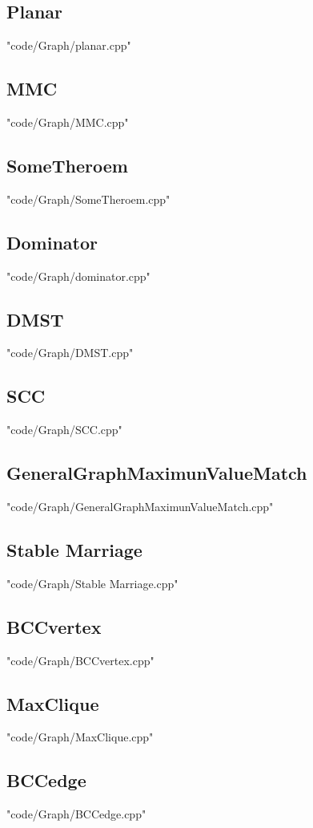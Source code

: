 \documentclass [8pt,a4paper,twocolumn]{article}
\begin{document}
\subsection{Planar}
 {"code/Graph/planar.cpp"}
\subsection{MMC}
 {"code/Graph/MMC.cpp"}
\subsection{SomeTheroem}
 {"code/Graph/SomeTheroem.cpp"}
\subsection{Dominator}
 {"code/Graph/dominator.cpp"}
\subsection{DMST}
 {"code/Graph/DMST.cpp"}
\subsection{SCC}
 {"code/Graph/SCC.cpp"}
\subsection{GeneralGraphMaximunValueMatch}
 {"code/Graph/GeneralGraphMaximunValueMatch.cpp"}
\subsection{Stable Marriage}
 {"code/Graph/Stable Marriage.cpp"}
\subsection{BCCvertex}
 {"code/Graph/BCCvertex.cpp"}
\subsection{MaxClique}
 {"code/Graph/MaxClique.cpp"}
\subsection{BCCedge}
 {"code/Graph/BCCedge.cpp"}
\end{document}
